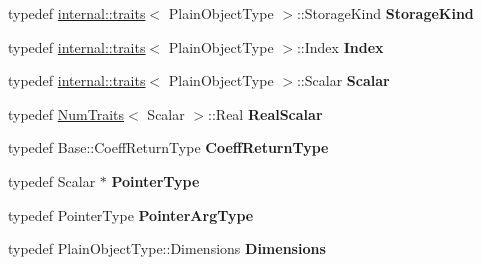 \begin{DoxyCompactItemize}
\item 
\mbox{\label{class_eigen_1_1_tensor_ref_aec0b9c51310c68fe4b9092cd61279305}} 
typedef \hyperlink{struct_eigen_1_1internal_1_1traits}{internal\+::traits}$<$ Plain\+Object\+Type $>$\+::Storage\+Kind {\bfseries Storage\+Kind}
\item 
\mbox{\label{class_eigen_1_1_tensor_ref_a1526154744d500392e87dc4fc67bc198}} 
typedef \hyperlink{struct_eigen_1_1internal_1_1traits}{internal\+::traits}$<$ Plain\+Object\+Type $>$\+::Index {\bfseries Index}
\item 
\mbox{\label{class_eigen_1_1_tensor_ref_aec8bfa5bff7aff53f179b96f641ec51c}} 
typedef \hyperlink{struct_eigen_1_1internal_1_1traits}{internal\+::traits}$<$ Plain\+Object\+Type $>$\+::Scalar {\bfseries Scalar}
\item 
\mbox{\label{class_eigen_1_1_tensor_ref_a665b2bd916ea866c6a04d614d6c7b742}} 
typedef \hyperlink{group___core___module_struct_eigen_1_1_num_traits}{Num\+Traits}$<$ Scalar $>$\+::Real {\bfseries Real\+Scalar}
\item 
\mbox{\label{class_eigen_1_1_tensor_ref_a65b5979724c422b74e5c4a1dcf02a8bb}} 
typedef Base\+::\+Coeff\+Return\+Type {\bfseries Coeff\+Return\+Type}
\item 
\mbox{\label{class_eigen_1_1_tensor_ref_affcdf4bec56026902f2e62d04ea7015d}} 
typedef Scalar $\ast$ {\bfseries Pointer\+Type}
\item 
\mbox{\label{class_eigen_1_1_tensor_ref_aa2ac960f39391d4e59fe58074d7302ee}} 
typedef Pointer\+Type {\bfseries Pointer\+Arg\+Type}
\item 
\mbox{\label{class_eigen_1_1_tensor_ref_a1f879eb1cae08e336692be625ccc0c4e}} 
typedef Plain\+Object\+Type\+::\+Dimensions {\bfseries Dimensions}
\end{DoxyCompactItemize}
